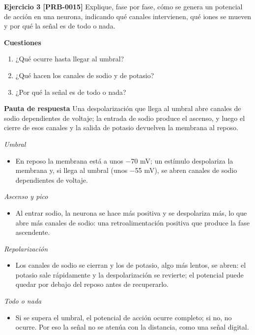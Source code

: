 \documentclass{book}
\begin{document}
\noindent\textbf{Ejercicio 3 [PRB-0015]}
Explique, fase por fase, cómo se genera un potencial de acción en una neurona, indicando qué canales intervienen, qué iones se mueven y por qué la señal es de todo o nada.


\noindent\textbf{Cuestiones}
\begin{enumerate}
\item ¿Qué ocurre hasta llegar al umbral?
\item ¿Qué hacen los canales de sodio y de potasio?
\item ¿Por qué la señal es de todo o nada?
\end{enumerate}

\noindent\textbf{Pauta de respuesta}
Una despolarización que llega al umbral abre canales de sodio dependientes de voltaje; la entrada de sodio produce el ascenso, y luego el cierre de esos canales y la salida de potasio devuelven la membrana al reposo.


\noindent\textit{Umbral}
\begin{itemize}
\item En reposo la membrana está a unos \(-\)70 mV; un estímulo despolariza la membrana y, si llega al umbral (unos \(-\)55 mV), se abren canales de sodio dependientes de voltaje.
\end{itemize}

\noindent\textit{Ascenso y pico}
\begin{itemize}
\item Al entrar sodio, la neurona se hace más positiva y se despolariza más, lo que abre más canales de sodio: una retroalimentación positiva que produce la fase ascendente.
\end{itemize}

\noindent\textit{Repolarización}
\begin{itemize}
\item Los canales de sodio se cierran y los de potasio, algo más lentos, se abren: el potasio sale rápidamente y la despolarización se revierte; el potencial puede quedar por debajo del reposo antes de recuperarlo.
\end{itemize}

\noindent\textit{Todo o nada}
\begin{itemize}
\item Si se supera el umbral, el potencial de acción ocurre completo; si no, no ocurre. Por eso la señal no se atenúa con la distancia, como una señal digital.
\end{itemize}
\end{document}

